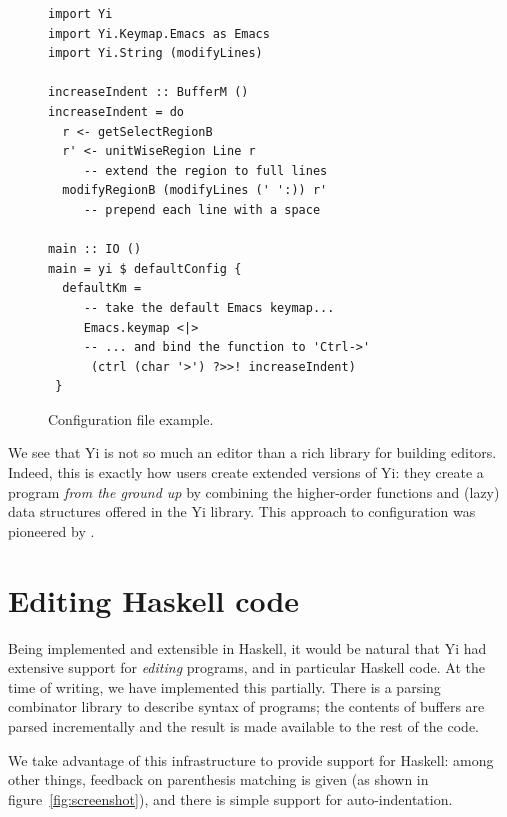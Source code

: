 \documentclass[9pt,indentedstyle,preprint]{sigplanconf}
\begin{document}
\begin{figure}
\begin{verbatim}
import Yi
import Yi.Keymap.Emacs as Emacs
import Yi.String (modifyLines)

increaseIndent :: BufferM ()
increaseIndent = do
  r <- getSelectRegionB 
  r' <- unitWiseRegion Line r 
     -- extend the region to full lines
  modifyRegionB (modifyLines (' ':)) r'
     -- prepend each line with a space
                                     
main :: IO ()
main = yi $ defaultConfig {
  defaultKm = 
     -- take the default Emacs keymap...
     Emacs.keymap <|> 
     -- ... and bind the function to 'Ctrl->'
      (ctrl (char '>') ?>>! increaseIndent)
 }
\end{verbatim}
\caption{Configuration file example.}
\label{fig:example}
\end{figure}

We see that Yi is not so much an editor than a rich library for
building editors. Indeed, this is exactly how users create
extended versions of Yi: they create a program {\em from the ground
  up} by combining the higher-order functions and (lazy) data
structures offered in the Yi library. This approach to
configuration was pioneered by \citet{Stewart2007XMonad}.

\section{Editing Haskell code}

Being implemented and extensible in Haskell, it would be natural that
Yi had extensive support for \emph{editing} programs, and in
particular Haskell code.  At the time of writing, we have implemented
this partially. There is a parsing combinator library to describe
syntax of programs; the contents of buffers are parsed incrementally
and the result is made available to the rest of the code.

We take advantage of this infrastructure to provide support for
Haskell: among other things, feedback on parenthesis matching is given
(as shown in figure~\ref{fig:screenshot}), and there is simple support
for auto-indentation.
\end{document}
